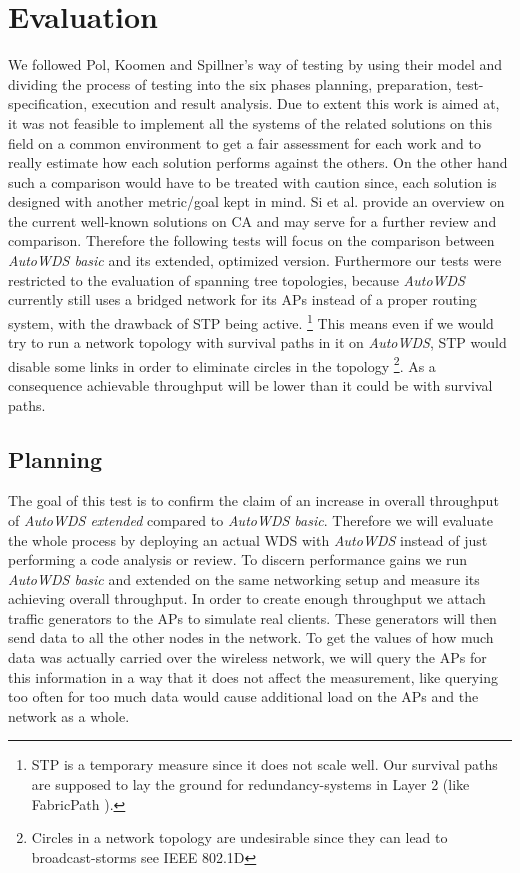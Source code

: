 \chapter{Evaluation}
We followed Pol, Koomen and Spillner's way of testing \cite{pol2000management} by using their model and dividing the process of testing into the 
six phases planning, preparation, test-specification, execution and result analysis. Due to extent this work is aimed at, 
it was not feasible to implement all the systems of the related solutions on this field on a common environment
to get a fair assessment for each work and to really estimate how each solution performs against the others. 
On the other hand such a comparison would have to be treated with caution since, each solution is designed with another metric/goal kept in mind.
Si et al. \cite{overview_caa} provide an overview on the current well-known solutions on \ac{CA} and may serve for a further review and comparison.
Therefore the following tests will focus on the comparison between \textit{AutoWDS basic} and its extended, optimized version.
Furthermore our tests were restricted to the evaluation of spanning tree topologies, because \textit{AutoWDS} currently 
still uses a bridged network for its APs instead of a proper routing system, with the drawback of \ac{STP} being active.
\footnote{\ac{STP} is a temporary measure since it does not scale well. 
Our survival paths are supposed to lay the ground for redundancy-systems in Layer 2 (like FabricPath \cite{fabricpath}).} 
This means even if we would try to run a network topology with survival paths in it on \textit{AutoWDS}, \ac{STP} would disable some links in order to 
eliminate circles in the topology \footnote{Circles in a network topology are undesirable since they can lead to broadcast-storms see \ac{IEEE} 802.1D}.
As a consequence achievable throughput will be lower than it could be with survival paths.

\newpage

  \section{Planning}
    The goal of this test is to confirm the claim of an increase in overall throughput of \textit{AutoWDS extended} compared to \textit{AutoWDS basic}.
    Therefore we will evaluate the whole process by deploying an actual \ac{WDS} with \textit{AutoWDS} instead of just performing a code analysis or review.
    To discern performance gains we run \textit{AutoWDS basic} and extended on the same networking setup and measure its achieving overall throughput.
    In order to create enough throughput we attach traffic generators to the APs to simulate real clients.
    These generators will then send data to all the other nodes in the network.
    To get the values of how much data was actually carried over the wireless network, we will query the APs for this information in a way that it 
    does not affect the measurement, like querying too often for too much data would cause additional load on the APs and the network as a whole.
    
